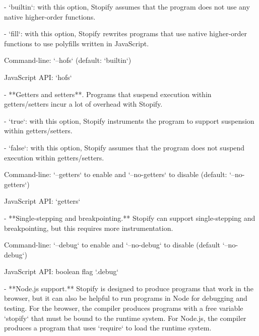 \documentclass{book}
\begin{document}
  - `builtin`: with this option, Stopify assumes that the program does not
    use any native higher-order functions.

  - `fill`: with this option, Stopify rewrites programs that use native
    higher-order functions to use polyfills written in JavaScript.

  Command-line: `--hofs` (default: `builtin`)

  JavaScript API: `hofs`

- **Getters and setters**. Programs that suspend execution within
  getters/setters incur a lot  of overhead with Stopify.

  - `true`: with this option, Stopify instruments the program to support
    suspension within getters/setters.

  - `false`: with this option, Stopify assumes that the program does not
    suspend execution within getters/setters.

  Command-line: `--getters` to enable and `--no-getters` to disable
  (default: `--no-getters`)

  JavaScript API: `getters`

- **Single-stepping and breakpointing.** Stopify can support single-stepping
  and breakpointing, but this requires more instrumentation.

  Command-line: `--debug` to enable and `--no-debug` to disable
  (default `--no-debug`)

  JavaScript API: boolean flag `.debug`

- **Node.js support.** Stopify is designed to produce programs that work in
  the browser, but it can also be helpful to run programs in Node for debugging
  and testing. For the browser, the compiler produces programs with a free
  variable `stopify` that must be bound to the runtime system. For Node.js,
  the compiler produces a program that uses `require` to load the runtime
  system.
\end{document}
